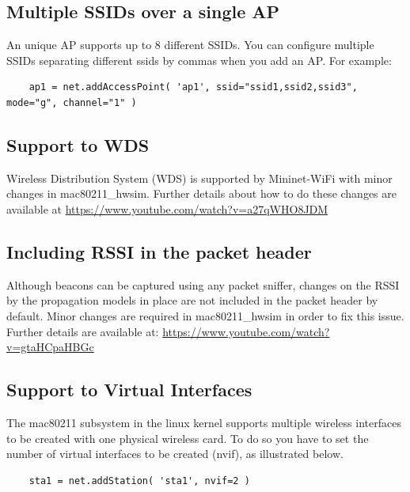 \subsection{Multiple SSIDs over a single AP}
An unique AP supports up to 8 different SSIDs. You can configure multiple SSIDs separating different ssids by commas when you add an AP. For example:

\begin{verbatim}
    ap1 = net.addAccessPoint( 'ap1', ssid="ssid1,ssid2,ssid3", mode="g", channel="1" )
\end{verbatim}

\subsection{Support to WDS}
Wireless Distribution System (WDS) is supported by Mininet-WiFi with minor changes in mac80211\_hwsim. Further details about how to do these changes are available at \url{https://www.youtube.com/watch?v=a27qWHO8JDM}

\subsection{Including RSSI in the packet header}
Although beacons can be captured using any packet sniffer, changes on the RSSI by the propagation models in place are
not included in the packet header by default. Minor changes are required in mac80211\_hwsim in order to fix this issue. Further details are available at: \url{https://www.youtube.com/watch?v=gtaHCpaHBGc}

\subsection{Support to Virtual Interfaces}

The mac80211 subsystem in the linux kernel supports multiple wireless interfaces to be created with one physical wireless card. To do so you have to set the number of virtual interfaces to be created (nvif), as illustrated below.

\begin{verbatim}
    sta1 = net.addStation( 'sta1', nvif=2 )
\end{verbatim}





